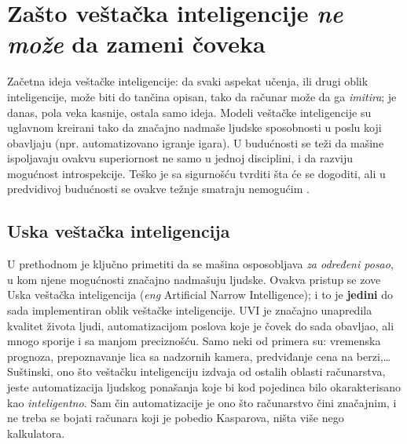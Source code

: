 \documentclass[a4paper]{article}
\begin{document}
\section{Zašto veštačka inteligencije \textit{ne može} da zameni čoveka}	
\label{poglavlje:ton}
Začetna ideja veštačke inteligencije: da svaki aspekat učenja, ili drugi oblik inteligencije, može biti do tančina opisan, tako da računar može da ga \emph{imitira}\cite{mitedu}; je danas, pola veka kasnije, ostala samo ideja. Modeli veštačke inteligencije su uglavnom kreirani tako da značajno nadmaše ljudske sposobnosti u poslu koji obavljaju\cite{floridi} (npr. automatizovano igranje igara). U budućnosti se teži da mašine ispoljavaju ovakvu superiornost ne samo u jednoj disciplini, i da razviju mogućnost introspekcije. Teško je sa sigurnošću tvrditi šta će se dogoditi, ali u predvidivoj budućnosti se ovakve težnje smatraju nemogućim \cite{fjelland}. 

\subsection{Uska veštačka inteligencija}
U prethodnom je ključno primetiti da se mašina osposobljava \emph{za određeni posao}, u kom njene mogućnosti značajno nadmašuju ljudske. Ovakva pristup se zove Uska veštačka inteligencija (\emph{eng} Artificial Narrow Intelligence); i to je \textbf{jedini} do sada implementiran oblik veštačke inteligencije. UVI je značajno unapredila kvalitet života ljudi, automatizacijom poslova koje je čovek do sada obavljao, ali mnogo sporije i sa manjom preciznošću. Samo neki od primera su: vremenska prognoza, prepoznavanje lica sa nadzornih kamera, predviđanje cena na berzi,\dots\\

Suštinski, ono što veštačku inteligenciju izdvaja od ostalih oblasti računarstva, jeste automatizacija ljudskog ponašanja koje bi kod pojedinca bilo okarakterisano kao \emph{inteligentno}. Sam čin automatizacije je ono što računarstvo čini značajnim, i ne treba se bojati računara koji je pobedio Kasparova, ništa više nego kalkulatora.\\
\end{document}
